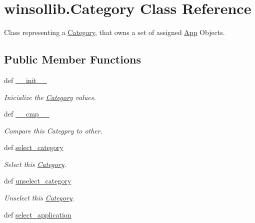\hypertarget{classwinsollib_1_1Category}{
\section{winsollib.Category Class Reference}
\label{classwinsollib_1_1Category}
}
Class representing a \hyperlink{classwinsollib_1_1Category}{Category}, that owns a set of assigned \hyperlink{classwinsollib_1_1App}{App} Objects.  


\subsection*{Public Member Functions}
\begin{CompactItemize}
\item 
def \hyperlink{classwinsollib_1_1Category_daae86f216d79ec0328c01945a0a18d6}{\_\-\_\-init\_\-\_\-}
\begin{CompactList}\small\item\em Inicialize the \hyperlink{classwinsollib_1_1Category}{Category} values. \item\end{CompactList}\item 
def \hyperlink{classwinsollib_1_1Category_6f1f13764c35d89518361b6f9fb951d5}{\_\-\_\-cmp\_\-\_\-}
\begin{CompactList}\small\item\em Compare this Categpry to other. \item\end{CompactList}\item 
def \hyperlink{classwinsollib_1_1Category_f230be763ff41f4c59b2c70ce1ef2fc0}{select\_\-category}
\begin{CompactList}\small\item\em Select this \hyperlink{classwinsollib_1_1Category}{Category}. \item\end{CompactList}\item 
def \hyperlink{classwinsollib_1_1Category_5673807f0d4c7462549baafd86b9b17a}{unselect\_\-category}
\begin{CompactList}\small\item\em Unselect this \hyperlink{classwinsollib_1_1Category}{Category}. \item\end{CompactList}\item 
def \hyperlink{classwinsollib_1_1Category_eb09534a04cc27552a864432fe6804e2}{select\_\-application}

\end{CompactItemize}
